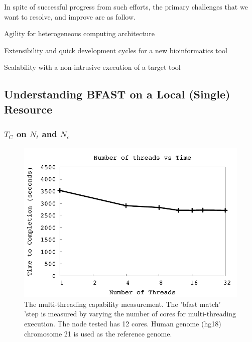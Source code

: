 \documentclass{acm_proc_article-sp}
\begin{document}
In spite of successful progress from such efforts, the primary
challenges that we want to resolve, and improve are as follow.
\begin{itemize*}
\item Agility for heterogeneous computing architecture
\item Extensibility and quick development cycles for a new bioinformatics tool
\item Scalability with a non-intrusive execution of a target tool  
\end{itemize*}


\subsection{Understanding BFAST on a Local (Single) Resource}

\subsubsection{$T_{C}$ on $N_t$ and $N_c$}

 \begin{figure}
 \centering
\includegraphics[scale=0.66]{figures/threadsvstime.pdf} 

\caption{\small The multi-threading capability measurement.  The 'bfast match' 'step is 
measured by varying the number of cores for multi-threading execution.  
The node tested has 12 cores.  Human genome (hg18) chromosome 21 is used as the reference genome.
  }
  \label{fig:parallel-execution} 
 \end{figure}
 
\end{document}
